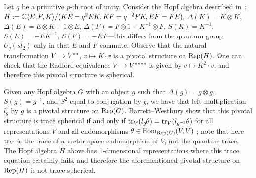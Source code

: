 \documentclass{amsart}
\begin{document}
\begin{example}
Let $q$ be a primitive $p$-th root of unity.  Consider the Hopf algebra described in~\cite[Rem. 7.5]{MR2097289}: $H := \mathbb C\langle E, F, K \rangle / (KE = q^2 EK, KF = q^{-2} FK, EF=FE)$, $\Delta(K) = K \otimes K$, $\Delta(E) = E \otimes K + 1 \otimes E$, $\Delta(F) = F \otimes 1 + K^{-1} \otimes F$, $S(K) = K^{-1}$, $S(E) = -EK^{-1}$, $S(F) = -KF$---this differs from the quantum group $U_q(sl_2)$ only in that $E$ and $F$ commute.  Observe that the natural transformation $V \rightarrow V^{**}$, $v \mapsto K \cdot v$ is a pivotal structure on $\mathrm{Rep}(H)$.  One can check that the Radford equivalence $V \rightarrow V^{****}$ is given by $v \mapsto K^2 \cdot v$, and therefore this pivotal structure is spherical.  

Given any Hopf algebra $G$ with an object $g$ such that $\Delta(g) = g \otimes g$, $S(g) = g^{-1}$, and $S^2$ equal to conjugation by $g$, we have that left multiplication $l_g$ by $g$ is a pivotal structure on $\mathrm{Rep}(G)$.  Barrett--Westbury show that this pivotal structure is trace spherical if and only if $\mathrm{tr}_V(l_g \theta) = \mathrm{tr}_V(l_{g^{-1}} \theta)$ for all representations $V$ and all endomorphisms $\theta \in \operatorname{Hom}_{\mathrm{Rep}(G)}(V,V)$ \cite{MR1686423}; note that here $\mathrm{tr}_V$ is the trace of a vector space endomorphism of $V$, not the quantum trace.  The Hopf algebra $H$ above has 1-dimensional representations where this trace equation certainly fails, and therefore the aforementioned pivotal structure on $\mathrm{Rep}(H)$ is not trace spherical.
\end{example}
\end{document}
